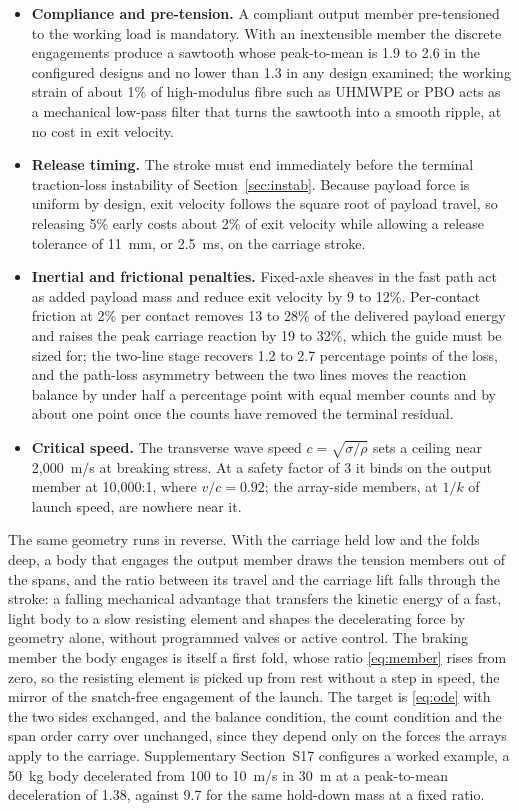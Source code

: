 \documentclass[preprint,12pt,number]{elsarticle}
\newcommand{\ptm}{peak-to-mean}
\begin{document}
\begin{itemize}
\item \textbf{Compliance and pre-tension.} A compliant output member pre-tensioned to the working load is mandatory. With an inextensible member the discrete engagements produce a sawtooth whose \ptm{} is 1.9 to 2.6 in the configured designs and no lower than 1.3 in any design examined; the working strain of about 1\% of high-modulus fibre such as UHMWPE or PBO acts as a mechanical low-pass filter that turns the sawtooth into a smooth ripple, at no cost in exit velocity.
\item \textbf{Release timing.} The stroke must end immediately before the terminal traction-loss instability of Section~\ref{sec:instab}. Because payload force is uniform by design, exit velocity follows the square root of payload travel, so releasing 5\% early costs about 2\% of exit velocity while allowing a release tolerance of 11~mm, or 2.5~ms, on the carriage stroke.
\item \textbf{Inertial and frictional penalties.} Fixed-axle sheaves in the fast path act as added payload mass and reduce exit velocity by 9 to 12\%. Per-contact friction at 2\% per contact removes 13 to 28\% of the delivered payload energy and raises the peak carriage reaction by 19 to 32\%, which the guide must be sized for; the two-line stage recovers 1.2 to 2.7 percentage points of the loss, and the path-loss asymmetry between the two lines moves the reaction balance by under half a percentage point with equal member counts and by about one point once the counts have removed the terminal residual.
\item \textbf{Critical speed.} The transverse wave speed $c = \sqrt{\sigma/\rho}$ sets a ceiling near 2,000~m/s at breaking stress. At a safety factor of 3 it binds on the output member at 10,000:1, where $v/c = 0.92$; the array-side members, at $1/k$ of launch speed, are nowhere near it.
\end{itemize}

The same geometry runs in reverse. With the carriage held low and the folds deep, a body that engages the output member draws the tension members out of the spans, and the ratio between its travel and the carriage lift falls through the stroke: a falling mechanical advantage that transfers the kinetic energy of a fast, light body to a slow resisting element and shapes the decelerating force by geometry alone, without programmed valves or active control. The braking member the body engages is itself a first fold, whose ratio \eqref{eq:member} rises from zero, so the resisting element is picked up from rest without a step in speed, the mirror of the snatch-free engagement of the launch. The target is \eqref{eq:ode} with the two sides exchanged, and the balance condition, the count condition and the span order carry over unchanged, since they depend only on the forces the arrays apply to the carriage. Supplementary Section~S17 configures a worked example, a 50~kg body decelerated from 100 to 10~m/s in 30~m at a \ptm{} deceleration of 1.38, against 9.7 for the same hold-down mass at a fixed ratio.
\end{document}
